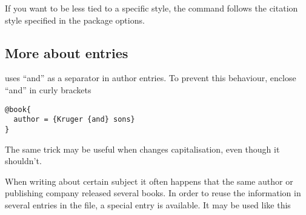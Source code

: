 If you want to be less tied to a specific style, the 
command follows the citation style specified in the package options.




\subsection{More about entries}

 uses ``and'' as a separator in author entries. To prevent
this behaviour, enclose ``and'' in curly brackets
\begin{verbatim}
@book{
  author = {Kruger {and} sons}
}
\end{verbatim}
The same trick may be useful when  changes capitalisation, even
though it shouldn't.

When writing about certain subject it often happens that the same author or
publishing company released several books. In order to reuse the information in
several entries in the  file, a special entry  is available. It may be used
like this



